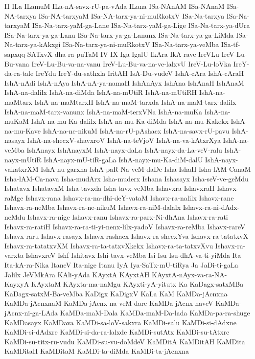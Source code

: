 {II
ILa
ILamuM
ILa-nA-savx-rU-pa-vAda
ILana
ISa-NAnAM
ISa-NAnaM
ISa-NA-tarxya
ISa-NA-tarxyaM
ISa-NA-tarx-ya-ni-muRkotxV
ISa-Na-tarxya
ISa-Na-tarxyaM
ISa-Na-tarx-yaM-ga-Lane
ISa-Na-tarx-yaM-ga-Lige
ISa-Na-tarx-ya-dUra
ISa-Na-tarx-ya-ga-Lanu
ISa-Na-tarx-ya-ga-Lanunx
ISa-Na-tarx-ya-ga-LiMda
ISa-Na-tarx-ya-kAkxgi
ISa-Na-tarx-ya-ni-muRkotxV
ISa-Na-tarx-ya-veMba
ISa-tf-sapxqq-SATxvX-dha-ra-puTaM
IV
IX
Iga
IgalU
IkAra
IkA-rave
IreVLu
IreV-Lu-Bu-vana
IreV-Lu-Bu-va-na-vanu
IreV-Lu-Bu-va-na-ve-lalxvU
IreV-Lu-loVka
IreY-da-ra-tale
IreYdu
IreY-du-sathxla
IritAH
IsA-Du-vudeV
IshA-cAra
IshA-cAraH
IshA-nAdi
IshA-nAya
IshA-nA-ya-namaH
IshAnAyx
IshAna
IshAnaH
IshAnaM
IshA-na-dalilx
IshA-na-diMda
IshA-na-mUtiR
IshA-na-mUtiRH
IshA-na-maMtarx
IshA-na-maMtarxH
IshA-na-maM-tarxda
IshA-na-maM-tarx-dalilx
IshA-na-maM-tarx-vanunx
IshA-na-maM-terxVNa
IshA-na-muKa
IshA-na-muKaM
IshA-na-mu-Ka-dalilx
IshA-na-mu-Ka-diMda
IshA-na-mu-Kakekx
IshA-na-mu-Kave
IshA-na-ne-nikuM
IshA-na-rU-pAshacx
IshA-na-savx-rU-pavu
IshA-nasayx
IshA-na-shecxV-shavxroV
IshA-na-teVjoV
IshA-na-va-kAtxrXya
IshA-na-veMba
IshAnayx
IshAnayxM
IshA-nayx-daLa
IshA-nayx-da-La-veV-ralu
IshA-nayx-mUtiR
IshA-nayx-mU-tiR-gaLa
IshA-nayx-mu-Ka-diM-dalU
IshA-nayx-vakatxrXM
IshA-nu-garxha
IshA-paR-Na-veM-daDe
Isha
IshaH
Isha-lAM-CanaM
Isha-lAM-Ca-nava
Isha-mudArx
Isha-muderx
Ishana
Ishasayx
Isha-seV-ve-geMdu
Ishatavx
IshatavxM
Isha-tavxda
Isha-tavx-veMba
Ishavxra
IshavxraH
Ishavx-raMge
Ishavx-rana
Ishavx-ra-na-dhi-deY-vataM
Ishavx-ra-nalilx
Ishavx-rane
Ishavx-ra-neMba
Ishavx-ra-ne-nikuM
Ishavx-ra-niM-dalalx
Ishavx-ra-ni-dAdx-neMdu
Ishavx-ra-nige
Ishavx-ranu
Ishavx-ra-parx-Ni-dhAna
Ishavx-ra-rati
Ishavx-ra-ratiH
Ishavx-ra-ra-ti-yi-nenx-lilx-yadoV
Ishavx-ra-reMba
Ishavx-rareV
Ishavx-raru
Ishavx-rasayx
Ishavx-rashacx
Ishavx-ra-shecxYva
Ishavx-ra-tatatxvX
Ishavx-ra-tatatxvXM
Ishavx-ra-ta-tatxvXkekx
Ishavx-ra-ta-tatxvXvu
Ishavx-ra-varxta
IshavxreV
Ishf
Ishitavx
Ishi-tavx-veMba
Isi
Isu
Isu-dhA-va-ti-yiMda
Ita
Ita-kA-ra-Nika
ItaneV
Ita-nige
Itanu
IyA
Iya-SaTx-mU-tiRya
Ja
JaDi-ti-gaLa
Jalilx
JeVMkAra
KAli-yAda
KAyxtA
KAyxtAH
KAyxtA-nAyx-va-ra-NA-KayxyA
KAyxtaM
KAyxta-ma-naMgu
KAyxti-yA-yitutx
Ka
KaDagx-satxMBa
KaDagx-satxM-Ba-veMba
KaDigx
KaDigxV
KaLa
KaM
KaMDa-jAcnxna
KaMDa-jAcnxnaM
KaMDa-jAcnx-na-veM-dare
KaMDa-jAcnx-naveV
KaMDa-jAcnx-ni-ga-LAda
KaMDa-maM-Dala
KaMDa-maM-Da-lada
KaMDa-pa-ra-shuge
KaMDasayx
KaMDava
KaMDi-sa-loV-sakxra
KaMDi-salu
KaMDi-si-dAdxne
KaMDi-si-dAdxre
KaMDi-si-da-ra-lalxde
KaMDi-sutAtx
KaMDi-su-tAtxre
KaMDi-su-titx-ru-vudu
KaMDi-su-vu-doMdeV
KaMDitA
KaMDitAH
KaMDita
KaMDitaH
KaMDitaM
KaMDi-ta-diMda
KaMDi-ta-jAcnxna
}
